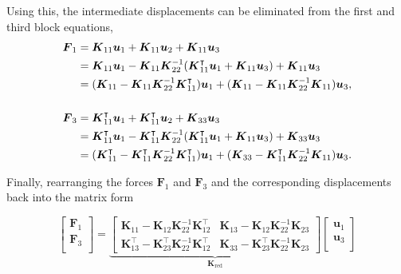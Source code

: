 Using this, the intermediate displacements can be eliminated from the first and third block equations,
%
\begin{align}
\boldsymbol{F}_1 &= \boldsymbol{K}_{11}\boldsymbol{u}_1 + \boldsymbol{K}_{11}\boldsymbol{u}_2 + \boldsymbol{K}_{11}\boldsymbol{u}_3 \notag \\
   &= \boldsymbol{K}_{11}\boldsymbol{u}_1 - \boldsymbol{K}_{11}\boldsymbol{K}_{22}^{-1}(\boldsymbol{K}_{11}^\intercal \boldsymbol{u}_1 + \boldsymbol{K}_{11}\boldsymbol{u}_3) + \boldsymbol{K}_{11}\boldsymbol{u}_3 \notag \\
   &= (\boldsymbol{K}_{11} - \boldsymbol{K}_{11}\boldsymbol{K}_{22}^{-1}\boldsymbol{K}_{11}^\intercal )\boldsymbol{u}_1 + (\boldsymbol{K}_{11} - \boldsymbol{K}_{11}\boldsymbol{K}_{22}^{-1}\boldsymbol{K}_{11})\boldsymbol{u}_3, \\
\notag \\
\boldsymbol{F}_3 &= \boldsymbol{K}_{11}^\intercal \boldsymbol{u}_1 + \boldsymbol{K}_{11}^\intercal \boldsymbol{u}_2 + \boldsymbol{K}_{33}\boldsymbol{u}_3 \notag \\
   &= \boldsymbol{K}_{11}^\intercal \boldsymbol{u}_1 - \boldsymbol{K}_{11}^\intercal \boldsymbol{K}_{22}^{-1}(\boldsymbol{K}_{11}^\intercal \boldsymbol{u}_1 + \boldsymbol{K}_{11}\boldsymbol{u}_3) + \boldsymbol{K}_{33}\boldsymbol{u}_3 \notag \\
   &= (\boldsymbol{K}_{11}^\intercal  - \boldsymbol{K}_{11}^\intercal \boldsymbol{K}_{22}^{-1}\boldsymbol{K}_{11}^\intercal )\boldsymbol{u}_1 + (\boldsymbol{K}_{33} - \boldsymbol{K}_{11}^\intercal \boldsymbol{K}_{22}^{-1}\boldsymbol{K}_{11})\boldsymbol{u}_3.
\end{align}

Finally, rearranging the forces $\boldsymbol{F}_1$ and $\boldsymbol{F}_3$ and the corresponding displacements back into the matrix form

\begin{equation}
\renewcommand\arraystretch{1.5}
\begin{bmatrix}
\boldsymbol{F}_{1} \\
\boldsymbol{F}_{3} \\
\end{bmatrix}
=
\underbrace{
\begin{bmatrix}
\boldsymbol{K}_{11} - \boldsymbol{K}_{12}\boldsymbol{K}_{22}^{-1}\boldsymbol{K}_{12}^\intercal   &   \boldsymbol{K}_{13} - \boldsymbol{K}_{12}\boldsymbol{K}_{22}^{-1}\boldsymbol{K}_{23} \\
\boldsymbol{K}_{13}^\intercal - \boldsymbol{K}_{23}^\intercal \boldsymbol{K}_{22}^{-1}\boldsymbol{K}_{12}^\intercal & \boldsymbol{K}_{33} - \boldsymbol{K}_{23}^\intercal \boldsymbol{K}_{22}^{-1}\boldsymbol{K}_{23}
\end{bmatrix}
}_{\boldsymbol{K}_{\mathrm{red}}}
\begin{bmatrix}
\boldsymbol{u}_{1} \\
\boldsymbol{u}_{3} \\
\end{bmatrix}
\end{equation}

